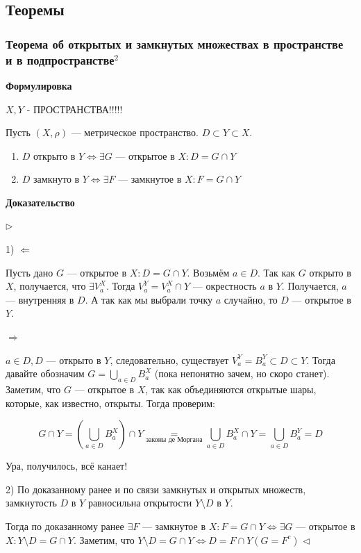 \documentclass{article}
\begin{document}
\subsection{Теоремы}
\subsubsection{Теорема об открытых и замкнутых множествах в пространстве\texorpdfstring{\\}{} и в подпространстве\texorpdfstring{$^2$}{}}

\textbf{Формулировка}

$X, Y$ - ПРОСТРАНСТВА!!!!!

Пусть $(X, \rho)$ --- метрическое пространство. $D \subset Y \subset X$.

\begin{enumerate}
    \item $D$ открыто в $Y \Leftrightarrow \exists G$ --- открытое в $X : D = G \cap Y$
    \item $D$ замкнуто в $Y \Leftrightarrow \exists F$ --- замкнутое в $X : F = G \cap Y$
\end{enumerate}

\textbf{Доказательство}

$\rhd$

1) $\Leftarrow$

Пусть дано $G$ --- открытое в $X : D = G \cap Y$. Возьмём $a \in D$. Так как $G$ открыто в $X$, получается, что $\exists V_a^X$. Тогда $V_a^Y = V_a^X \cap Y$ --- окрестность $a$ в $Y$. Получается, $a$ --- внутренняя в $D$. А так как мы выбрали точку $a$ случайно, то $D$ --- открытое в $Y$.

$\Rightarrow$

$a \in D, D$ --- открыто в $Y$, следовательно, существует $V_a^Y = B_a^Y \subset D \subset Y$. Тогда давайте обозначим $G = \bigcup_{a \in D} B_a^X$ (пока непонятно зачем, но скоро станет). Заметим, что $G$ --- открытое в $X$, так как объединяются открытые шары, которые, как известно, открыты. Тогда проверим:

\[G \cap Y = \left(\bigcup_{a \in D} B_a^X\right) \cap Y \underset{\text{законы де Моргана}}{=} \bigcup_{a \in D}{B_a^X \cap Y} = \bigcup_{a \in D}{B_a^Y} = D \]

Ура, получилось, всё канает!

2) По доказанному ранее и по связи замкнутых и открытых множеств, замкнутость $D$ в $Y$ равносильна открытости $Y \setminus D$ в $Y$. 

Тогда по доказанному ранее $\exists F$ --- замкнутое в $X : F = G \cap Y \Leftrightarrow \exists G$ --- открытое в $X : Y \setminus D = G \cap Y$. Заметим, что $Y \setminus D = G \cap Y \Leftrightarrow D = F \cap Y (G = F^c)$
$\lhd$
\end{document}
